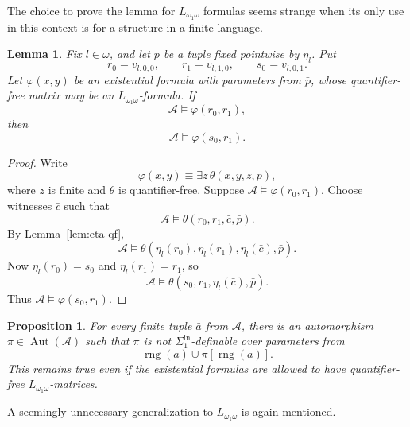 \documentclass[12pt]{article}
\newtheorem{proposition}[theorem]{Proposition}
\newtheorem{lemma}[theorem]{Lemma}
\theoremstyle{definition}
\theoremstyle{remark}
\newcommand{\Aut}{\operatorname{Aut}}
\newcommand{\rng}{\operatorname{rng}}
\newcommand{\review}[1]{\begin{reviewbox}#1\end{reviewbox}}
\begin{document}
\review{The choice to prove the lemma for $L_{\omega_1 \omega}$ formulas seems strange when its only use in this context is for a structure in a finite language.}

\begin{lemma}\label{lem:existential-transfer}
Fix \(l\in\omega\), and let \(\bar p\) be a tuple fixed pointwise by \(\eta_l\).  Put
\[
r_0=v_{l,0,0},\qquad r_1=v_{l,1,0},\qquad s_0=v_{l,0,1}.
\]
Let \(\varphi(x,y)\) be an existential formula with parameters from \(\bar p\), whose quantifier-free matrix may be an \(L_{\omega_1\omega}\)-formula.  If
\[
\mathcal A\models \varphi(r_0,r_1),
\]
then
\[
\mathcal A\models \varphi(s_0,r_1).
\]
\end{lemma}

\begin{proof}
Write
\[
\varphi(x,y)\equiv \exists \bar z\,\theta(x,y,\bar z,\bar p),
\]
where \(\bar z\) is finite and \(\theta\) is quantifier-free.  Suppose \(\mathcal A\models\varphi(r_0,r_1)\).  Choose witnesses \(\bar c\) such that
\[
\mathcal A\models \theta(r_0,r_1,\bar c,\bar p).
\]
By Lemma~\ref{lem:eta-qf},
\[
\mathcal A\models \theta(\eta_l(r_0),\eta_l(r_1),\eta_l(\bar c),\bar p).
\]
Now \(\eta_l(r_0)=s_0\) and \(\eta_l(r_1)=r_1\), so
\[
\mathcal A\models \theta(s_0,r_1,\eta_l(\bar c),\bar p).
\]
Thus \(\mathcal A\models\varphi(s_0,r_1)\).
\end{proof}

\begin{proposition}\label{prop:nondef}
For every finite tuple \(\bar a\) from \(\mathcal A\), there is an automorphism \(\pi\in\Aut(\mathcal A)\) such that \(\pi\) is not \(\Sigma^{\mathrm{in}}_1\)-definable over parameters from
\[
\rng(\bar a)\cup \pi[\rng(\bar a)].
\]
This remains true even if the existential formulas are allowed to have quantifier-free \(L_{\omega_1\omega}\)-matrices.
\end{proposition}

\review{A seemingly unnecessary generalization to $L_{\omega_1 \omega}$ is again mentioned.}
\end{document}
